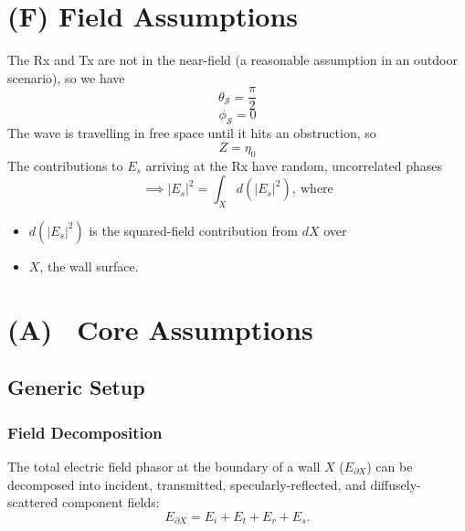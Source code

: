 \documentclass{article}
\begin{document}
\section*{(F) Field Assumptions}
The Rx and Tx are not in the near-field (a reasonable assumption in an outdoor
scenario), so we have
\begin{equation}
   \theta_{\mathcal{S}} = \frac{\pi}{2}
   \label{eq:spatialAngleAssumption}
\end{equation}
\begin{equation}
   \phi_{\mathcal{S}} = 0
   \label{eq:phaseAngleAssumption}
\end{equation}
The wave is travelling in free space until it hits an obstruction, so
\begin{equation}
   Z = \eta_0
   \label{eq:freeSpaceAssumption}
\end{equation}
      The contributions to $E_s$ arriving at the Rx have random, uncorrelated phases
      \begin{equation}
         \implies |E_{s}|^2 = \int_X d(|E_s|^2), \ \text{where}
         \label{eq:incoherence}
      \end{equation}
      \begin{itemize}
         \item $d(|E_s|^2)$ is the squared-field contribution from $dX$ over
         \item $X$, the wall surface.
      \end{itemize}
\newpage
\setcounter{section}{1}   %
\setcounter{subsection}{-1}
\setcounter{equation}{-1}  %
\section*{(A) \ Core Assumptions}
\subsection{Generic Setup}
\subsubsection{Field Decomposition}
The total electric field phasor at the boundary of a wall $X$ ($E_{\partial X}$) can
be decomposed into incident, transmitted, specularly-reflected, and
diffusely-scattered component fields:
\begin{equation}
   E_{\partial X} = E_i + E_t + E_r + E_s.
   \label{eq:fieldDecomposition}
\end{equation}
\end{document}
